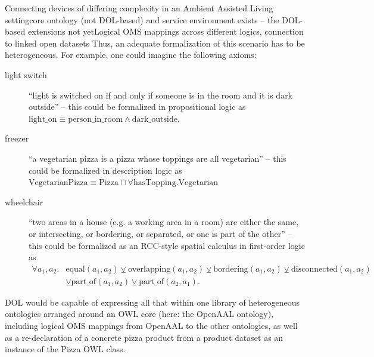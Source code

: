 \documentclass[10pt,%
\ifpretendfinal
final%
\else
draft%
\fi,
]{scrreprt}
\makeatletter
\newcommand*{\eg}{e.g.\@\xspace}
\makeatother
\begin{document}
\begin{usecase}{Connecting devices of differing complexity in an Ambient Assisted Living setting}{core ontology (not DOL-based) and service environment exists – the DOL-based extensions not yet}{Logical OMS mappings across different logics, connection to linked open datasets}
  Thus, an adequate formalization of this scenario has to be heterogeneous.  For example, one could imagine the following axioms:
  \begin{description}
  \item[light switch] ``light is switched on if and only if someone is in the room and it is dark outside'' – this could be formalized in propositional logic as $\mathrm{light\_on}\equiv\mathrm{person\_in\_room}\wedge\mathrm{dark\_outside}$.
  \item[freezer] ``a vegetarian pizza is a pizza whose toppings are all vegetarian'' – this could be formalized in description logic as $\mathrm{VegetarianPizza}\equiv\mathrm{Pizza}\sqcap \forall \mathrm{hasTopping}.\mathrm{Vegetarian}$
  \item[wheelchair] ``two areas in a house (\eg a working area in a room) are either the same, or intersecting, or bordering, or separated, or one is part of the other'' – this could be formalized as an RCC-style spatial calculus in first-order logic as $$\begin{array}{ll}\forall a_1, a_2 . & \mathrm{equal}(a_1, a_2) \veebar \mathrm{overlapping}(a_1, a_2) \veebar \mathrm{bordering}(a_1, a_2) \veebar \mathrm{disconnected}(a_1, a_2) \\
&\veebar \mathrm{part\_of}(a_1, a_2) \veebar \mathrm{part\_of}(a_2, a_1).\end{array}$$
  \end{description}
  
  DOL would be capable of expressing all that within one library of heterogeneous ontologies arranged around an OWL core (here: the OpenAAL ontology), including logical OMS mappings from OpenAAL to the other ontologies, as well as a re-declaration of a concrete pizza product from a product dataset as an instance of the Pizza OWL class.
\end{usecase}
\end{document}
